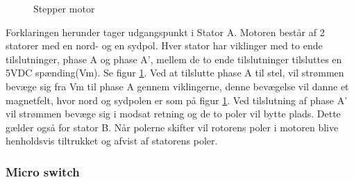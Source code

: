 \begin{figure}[H] \centering
    \caption{Stepper motor}
    \label{fig:HWD_Bipolar_Stepper_Motor}
\end{figure}

Forklaringen herunder tager udgangspunkt i Stator A.
\newline Motoren består af 2 statorer med en nord- og en sydpol. Hver stator har viklinger med to ende tilslutninger, phase A og phase A’, mellem de to ende tilslutninger tilsluttes en 5VDC spænding(Vm). Se figur \ref{fig:HWD_Bipolar_Stepper_Motor}.
Ved at tilslutte phase A til stel, vil strømmen bevæge sig fra Vm til phase A gennem viklingerne, denne bevægelse vil danne et magnetfelt, hvor nord og sydpolen er som på figur \ref{fig:HWD_Bipolar_Stepper_Motor}. Ved tilslutning af phase A’ vil strømmen bevæge sig i modsat retning og de to poler vil bytte plads. Dette gælder også for stator B. Når polerne skifter vil rotorens poler i motoren blive henholdsvis tiltrukket og afvist af statorens poler.

\subsubsection{Micro switch}

